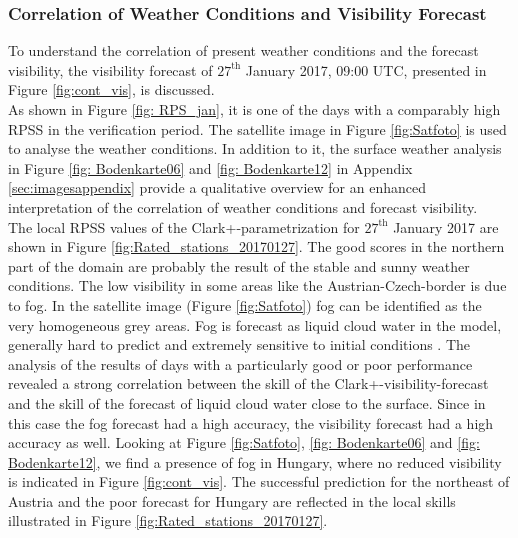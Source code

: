 \subsubsection{Correlation of Weather Conditions and Visibility Forecast}
To understand the correlation of present weather conditions and the forecast visibility, the visibility forecast of $27^{\mathrm{th}}$ January 2017, 09:00 UTC, presented in Figure \ref{fig:cont_vis}, is discussed.\\
As shown in Figure \ref{fig: RPS_jan}, it is one of the days with a comparably high RPSS in the verification period. The satellite image in Figure \ref{fig:Satfoto} is used to analyse the weather conditions. In addition to it, the surface weather analysis in Figure \ref{fig: Bodenkarte06} and \ref{fig: Bodenkarte12} in  Appendix \ref{sec:imagesappendix} provide a qualitative overview for an enhanced interpretation of the correlation of weather conditions and forecast visibility. \\
The local RPSS values of the Clark+-parametrization for $27^{\mathrm{th}}$ January 2017 are shown in Figure \ref{fig:Rated_stations_20170127}.
The good scores in the northern part of the domain are probably the result of the stable and sunny weather conditions. 
The low visibility in some areas like the Austrian-Czech-border is due to fog. In the satellite image (Figure \ref{fig:Satfoto}) fog can be identified as the very homogeneous grey areas. Fog is forecast as liquid cloud water in the model, generally hard to predict and extremely sensitive to initial conditions \cite{zhou2012forecast}. The analysis of the results of days with a particularly good or poor performance revealed a strong correlation between the skill of the  Clark+-visibility-forecast and the skill of the forecast of liquid cloud water close to the surface. Since in this case the fog forecast had a high accuracy, the visibility forecast had a high accuracy as well. Looking at Figure \ref{fig:Satfoto}, \ref{fig: Bodenkarte06} and \ref{fig: Bodenkarte12}, we find a presence of fog in Hungary, where no reduced visibility is indicated in Figure \ref{fig:cont_vis}. The successful prediction for the northeast of Austria and the poor forecast for Hungary are reflected in the local skills illustrated in Figure \ref{fig:Rated_stations_20170127}.
